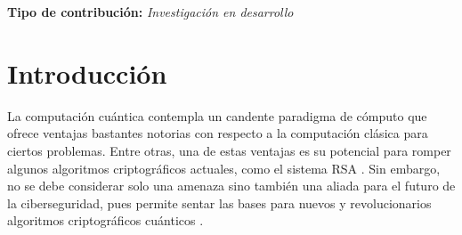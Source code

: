 \documentclass[10pt,conference,a4paper]{IEEEtran}
\begin{document}
{\bf Tipo de contribución:}  {\it Investigación en desarrollo}


\section{Introducción}
La computación cuántica contempla un candente paradigma de cómputo que ofrece ventajas bastantes notorias con respecto a la computación clásica para ciertos problemas. Entre otras, una de estas ventajas es su potencial para romper algunos algoritmos criptográficos actuales, como el sistema RSA \cite{Shor} \cite{RSA}. Sin embargo, no se debe considerar solo una amenaza sino también una aliada para el futuro de la ciberseguridad, pues permite sentar las bases para nuevos y revolucionarios algoritmos criptográficos cuánticos \cite{BB84} \cite{BB2014} \cite{E91}. 
\end{document}

